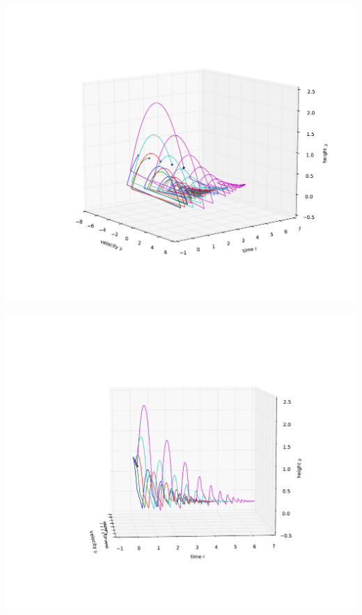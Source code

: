 \documentclass[12pt]{beamer}
\begin{document}
\begin{frame}
\vfill\centering
\includegraphics[width=.9\linewidth]{pic/bouncing_ball_deflattened}
\vfill\null
\end{frame}
\begin{frame}
\vfill\centering
\includegraphics[width=.9\linewidth]{pic/bouncing_ball_deflattened2}
\vfill\null
\end{frame}
\end{document}
